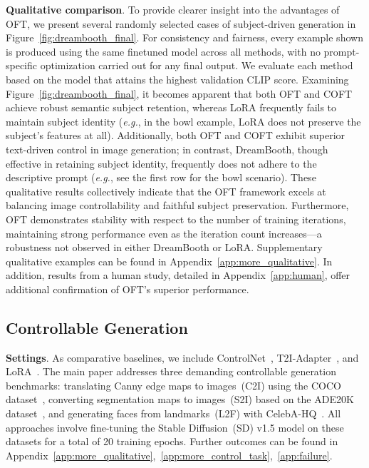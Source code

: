 {\textbf{Qualitative comparison}. To provide clearer insight into the advantages of OFT, we present several randomly selected cases of subject-driven generation in Figure~\ref{fig:dreambooth_final}. For consistency and fairness, every example shown is produced using the same finetuned model across all methods, with no prompt-specific optimization carried out for any final output. We evaluate each method based on the model that attains the highest validation CLIP score. Examining Figure~\ref{fig:dreambooth_final}, it becomes apparent that both OFT and COFT achieve robust semantic subject retention, whereas LoRA frequently fails to maintain subject identity (\emph{e.g.}, in the bowl example, LoRA does not preserve the subject’s features at all). Additionally, both OFT and COFT exhibit superior text-driven control in image generation; in contrast, DreamBooth, though effective in retaining subject identity, frequently does not adhere to the descriptive prompt (\emph{e.g.}, see the first row for the bowl scenario). These qualitative results collectively indicate that the OFT framework excels at balancing image controllability and faithful subject preservation. Furthermore, OFT demonstrates stability with respect to the number of training iterations, maintaining strong performance even as the iteration count increases—a robustness not observed in either DreamBooth or LoRA. Supplementary qualitative examples can be found in Appendix~\ref{app:more_qualitative}. In addition, results from a human study, detailed in Appendix~\ref{app:human}, offer additional confirmation of OFT's superior performance.

\subsection{Controllable Generation}

\textbf{Settings}. As comparative baselines, we include ControlNet~\cite{zhang2023adding}, T2I-Adapter~\cite{mou2023t2i}, and LoRA~\cite{hulora2022}. The main paper addresses three demanding controllable generation benchmarks: translating Canny edge maps to images~(C2I) using the COCO dataset~\cite{lin2014microsoft}, converting segmentation maps to images~(S2I) based on the ADE20K dataset~\cite{zhou2017scene}, and generating faces from landmarks~(L2F) with CelebA-HQ~\cite{karras2018progressive,xia2021tedigan}. All approaches involve fine-tuning the Stable Diffusion~(SD) v1.5 model on these datasets for a total of 20 training epochs. Further outcomes can be found in Appendix~\ref{app:more_qualitative},~\ref{app:more_control_task},~\ref{app:failure}.

}
